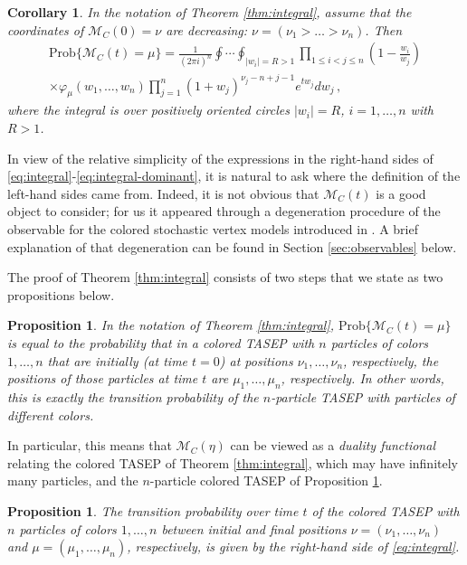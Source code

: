 \documentclass[11pt,reqno]{amsart}
\newtheorem{prop}[thm]{Proposition}
\newtheorem{cor}[thm]{Corollary}
\theoremstyle{definition}
\theoremstyle{remark}
\theoremstyle{remark}
\def\leq{\leqslant}
\renewcommand\le{\leq}
\def\M{\mathcal M}
\numberwithin{equation}{section}
\begin{document}
	\begin{cor}\label{cor:integral}
		In the notation of Theorem \ref{thm:integral}, assume that the coordinates of $\M_C(0)=\nu$ are decreasing: $\nu=(\nu_1>\dots>\nu_n)$. Then 
		\begin{equation}\label{eq:integral-dominant}
			\begin{gathered}
				\mathrm{Prob}\{\M_C(t)=\mu\}=\frac{1}{(2\pi i)^n}\oint\cdots\oint_{|w_i|=R>1} \prod_{1\le i<j\le n} \left(1-\frac{w_i}{w_j}\right) \\ \times \varphi_\mu(w_1,\dots,w_n)\prod_{j=1}^n 
				{(1+w_j)^{\nu_j-n+j-1}}{e^{tw_j} dw_j}\,,
			\end{gathered}
		\end{equation}
		where the integral is over positively oriented circles $|w_i|=R$, $i=1,\dots,n$ with $R>1$. 
	\end{cor}
	
	In view of the relative simplicity of the expressions in the right-hand sides of \eqref{eq:integral}-\eqref{eq:integral-dominant}, it is natural to ask where the definition of the left-hand sides came from. Indeed, it is not obvious that $\M_C(t)$ is a good object to consider; for us it appeared through a degeneration procedure of the observable for the colored stochastic vertex models introduced in \cite{BW-observables}. A brief explanation of that degeneration can be found in Section \ref{sec:observables} below. 
	
	The proof of Theorem \ref{thm:integral} consists of two steps that we state as two propositions below. 
	
	\begin{prop}\label{prop:duality}
		In the notation of Theorem \ref{thm:integral}, $\mathrm{Prob}\{\M_C(t)=\mu\}$ is equal to the probability that in a colored TASEP with $n$ particles of colors $1,\dots,n$ that are initially (at time $t=0$) at positions $\nu_1,\dots,\nu_n$, respectively, the positions of those particles at time $t$ are $\mu_1,\dots,\mu_n$, respectively. 
		In other words, this is exactly the transition probability of the $n$-particle TASEP with particles of different colors.   
	\end{prop}
	
	In particular, this means that $\M_C(\eta)$ can be viewed as a \emph{duality functional} relating the colored TASEP of Theorem \ref{thm:integral}, which may have infinitely many particles, and the $n$-particle colored TASEP of Proposition \ref{prop:duality}.
	
	\begin{prop}\label{prop:TASEP-transition}
		The transition probability over time $t$ of the colored TASEP with $n$ particles of colors $1,\dots,n$ between initial and final positions $\nu=(\nu_1,\dots,\nu_n)$ and $\mu=(\mu_1,\dots,\mu_n)$, respectively, is given by the right-hand side of \eqref{eq:integral}. 
	\end{prop}	
	
\end{document}
